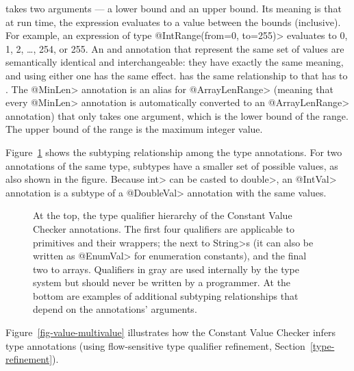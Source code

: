 
 takes two arguments --- a lower
bound and an upper bound.  Its meaning is that at run time, the expression
evaluates to a value between the bounds (inclusive).  For example, an
expression of type \<@IntRange(from=0, to=255)> evaluates to
0, 1, 2, \ldots, 254, or 255.
An  and
 annotation that represent the
same set of values are semantically identical and interchangeable:  they
have exactly the same meaning, and using either one has the same effect.
 has the same relationship
to  that
 has to
.
The \<@MinLen> annotation is an alias for \<@ArrayLenRange> (meaning that every \<@MinLen> annotation
 is automatically converted to an \<@ArrayLenRange> annotation) that only takes
one argument, which is the lower bound of the range. The upper bound of the
range is the maximum integer value.

Figure~\ref{fig-value-hierarchy} shows the
subtyping relationship among the type annotations.
For two annotations of the same type, subtypes have a smaller set of
possible values, as also shown in the figure.
Because \<int> can be casted to \<double>, an \<@IntVal> annotation is a
subtype of a \<@DoubleVal> annotation with the same values.

\begin{figure}
\caption{At the top, the type qualifier hierarchy of the Constant Value Checker
  annotations.
  The first four qualifiers are applicable to primitives and their
  wrappers; the next to \<String>s (it can also be written as \<@EnumVal> for
  enumeration constants), and the final two to arrays.
Qualifiers in gray are used
internally by the type system but should never be written by a
programmer.  At the bottom are examples of additional subtyping
relationships that depend on the annotations' arguments.}
\label{fig-value-hierarchy}
\end{figure}

Figure~\ref{fig-value-multivalue} illustrates how the Constant Value Checker
infers type annotations (using flow-sensitive type qualifier refinement, Section~\ref{type-refinement}).

